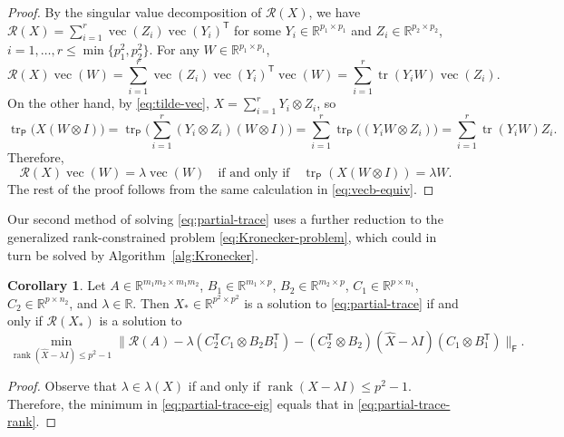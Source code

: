 \documentclass[11pt,reqno]{amsart}
\newcommand{\tp}{{\scriptscriptstyle\mathsf{T}}}
\newcommand{\F}{{\scriptscriptstyle\mathsf{F}}}
\newcommand{\Par}{{\scriptscriptstyle\mathsf{P}}}
\DeclareMathOperator{\rank}{rank}
\DeclareMathOperator{\tr}{tr}
\DeclareMathOperator{\vect}{vec}
\theoremstyle{definition}
\newtheorem{corollary}[theorem]{Corollary}
\numberwithin{equation}{section}
\newcommand{\R}{\mathbb{R}}
\begin{document}
\begin{proof}
By the singular value decomposition of $\mathcal{R}(X)$, we have $\mathcal{R}(X) = \sum_{i=1}^{r} \vect(Z_i) \vect(Y_i)^\tp$ for some $Y_i \in \R^{p_1 \times p_1}$ and $Z_i \in \R^{p_2 \times p_2}$, $i=1,\dots,r \le \min\{p_1^2,p_2^2\}$. For any $W \in \R^{p_1 \times p_1}$, 
\[\mathcal{R}(X)\vect(W) = \sum_{i=1}^{r} \vect(Z_i) \vect(Y_i)^\tp \vect(W) =  \sum_{i=1}^{r} \tr(Y_i W) \vect(Z_i).\]
On the other hand, by \eqref{eq:tilde-vec}, $X = \sum_{i=1}^{r} Y_i \otimes Z_i$, so
\[
\tr_\Par\bigl(X(W \otimes I)\bigr) =\tr_\Par \biggl(\sum_{i=1}^{r} (Y_i \otimes Z_i) (W \otimes I) \biggr) = \sum_{i=1}^{r}  \tr_\Par \bigl((Y_i W \otimes Z_i)\bigr)= \sum_{i=1}^{r} \tr(Y_i W) Z_i.
\]
Therefore, 
\begin{equation}\label{eq:partial-eig}
    \mathcal{R}(X)\vect(W) = \lambda \vect(W) \quad \text{if and only if} \quad \tr_\Par(X(W \otimes I)) = \lambda W.
\end{equation}
The rest of the proof follows from the same calculation in \eqref{eq:vecb-equiv}.
\end{proof}

Our second method of solving \eqref{eq:partial-trace} uses a further reduction to the generalized rank-constrained problem \eqref{eq:Kronecker-problem}, which could in turn be solved by Algorithm~\ref{alg:Kronecker}.
\begin{corollary}\label{cor:partial-trace}
Let $A \in \R^{m_1m_2\times m_1m_2}$, $B_1 \in \R^{m_1 \times p}$, $B_2 \in \R^{m_2 \times p}$, $C_1 \in \R^{p \times n_1}$, $C_2 \in \R^{p \times n_2}$, and $\lambda \in \R$. Then $X_* \in \R^{p^2 \times p^2}$ is a solution to \eqref{eq:partial-trace} if and only if $\mathcal{R}(X_*)$ is a solution to 
\begin{equation} \label{eq:partial-trace-rank}
\min_{\rank(\widehat{X}-\lambda I) \le p^2-1}
	\lVert \mathcal{R}(A)-\lambda(C_2^\tp C_1 \otimes B_2 B_1^\tp) - (C_2^\tp \otimes B_2)(\widehat{X} - \lambda I)(C_1 \otimes B_1^\tp)\rVert_\F.
\end{equation}
\end{corollary}
\begin{proof}
Observe that $\lambda \in \lambda(X)$ if and only if $\rank(X-\lambda I) \le p^2-1$. Therefore, the minimum in  \eqref{eq:partial-trace-eig} equals that in \eqref{eq:partial-trace-rank}.
\end{proof}
\end{document}
